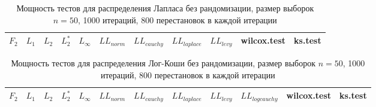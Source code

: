 \documentclass{article}
\begin{document}
\newpage

\begin{longtable}{|c|c|c|c|c|c|c|c|c|c|c|}
  \caption{Мощность тестов для распределения Лапласа без рандомизации, размер выборок $n=50$, 1000 итераций, 800 перестановок в каждой итерации}
  \label{table:n50} \\
  \hline
  $F_2$ & $L_{1}$ & $L_{2}$ & $L_2^*$ & $L_{\infty}$ & $LL_{norm}$ & $LL_{cauchy}$ & $LL_{laplace}$ & $LL_{levy}$ & wilcox.test & ks.test \\ \hline
  
\end{longtable}

\begin{longtable}{|c|c|c|c|c|c|c|c|c|c|c|c|}
  \caption{Мощность тестов для распределения Лог-Коши без рандомизации, размер выборок $n=50$, 1000 итераций, 800 перестановок в каждой итерации}
  \label{table:n50} \\
  \hline
  $F_2$ & $L_{1}$ & $L_{2}$ & $L_2^*$ & $L_{\infty}$ & $LL_{norm}$ & $LL_{cauchy}$ & $LL_{laplace}$ & $LL_{levy}$ & $LL_{logcauchy}$ & wilcox.test & ks.test \\ \hline
  
\end{longtable}
\end{document}
